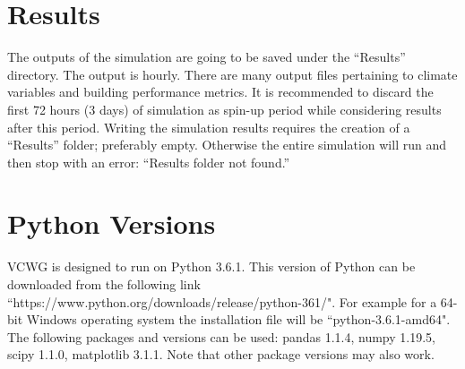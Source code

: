 \documentclass[12pt]{article}
\begin{document}
\section{Results}

The outputs of the simulation are going to be saved under the ``Results'' directory. The output is hourly. There are many output files pertaining to climate variables and building performance metrics. It is recommended to discard the first 72 hours (3 days) of simulation as spin-up period while considering results after this period. Writing the simulation results requires the creation of a ``Results'' folder; preferably empty. Otherwise the entire simulation will run and then stop with an error: ``Results folder not found.''

\section{Python Versions}

VCWG is designed to run on Python 3.6.1. This version of Python can be downloaded from the following link ``https://www.python.org/downloads/release/python-361/". For example for a 64-bit Windows operating system the installation file will be ``python-3.6.1-amd64". The following packages and versions can be used: pandas 1.1.4, numpy 1.19.5, scipy 1.1.0, matplotlib 3.1.1. Note that other package versions may also work.



\end{document}
